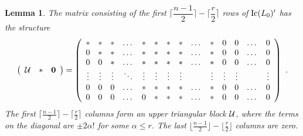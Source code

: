 \documentclass{amsproc}
\newtheorem{lemma}[theorem]{Lemma}
\theoremstyle{definition}
\theoremstyle{remark}
\numberwithin{equation}{section}
\newcommand{\Ic}{{\rm Ic}}
\begin{document}
\begin{lemma}\label{upper_triang_part}
The matrix consisting of the first $\lceil \dfrac{n-1}{2}\rceil-\lceil \dfrac r 2\rceil$ rows of $\Ic(L_0)'$ has the structure
\[\left(\begin{array}{ccc} \mathcal{U}&\ast&{\bf 0}\end{array}\right)=
\left(\begin{array}{cccccccccccccc}
\ast     & \ast     & \ast     & \dots    & \ast    & \ast     & \ast      & \ast    & \dots   & \ast     & 0          & 0        & \dots & 0\\
0         & \ast     & \ast     & \dots    & \ast    & \ast     & \ast      & \ast    & \dots   & \ast     & 0          & 0        & \dots & 0\\
0         & 0         & \ast     & \dots    & \ast    & \ast     & \ast      & \ast    & \dots   & \ast     & 0          & 0         & \dots & 0\\
\vdots & \vdots & \vdots & \ddots & \vdots & \vdots & \vdots & \vdots &            & \vdots & \vdots & \vdots &          & \vdots\\
0         & 0         & 0         & \dots    & \ast    & \ast     & \ast      & \ast     & \dots   & \ast     & 0         & 0         & \dots & 0\\
0         & 0         & 0         & \dots    & 0        & \ast     & \ast      & \ast     & \dots   & \ast      & 0         & 0        & \dots & 0\\
\end{array}\right)\ .\]
The first $\lceil\frac{n-1}{2}\rceil-\lceil\frac r 2\rceil$ columns form an upper triangular block $\mathcal{U}$, where the terms on the diagonal are $\pm 2\alpha!$ for some $\alpha\leqslant r$. The last $\lfloor\frac{n-1}2\rfloor-\lfloor\frac r 2\rfloor$ columns are zero.
\end{lemma}
\end{document}
